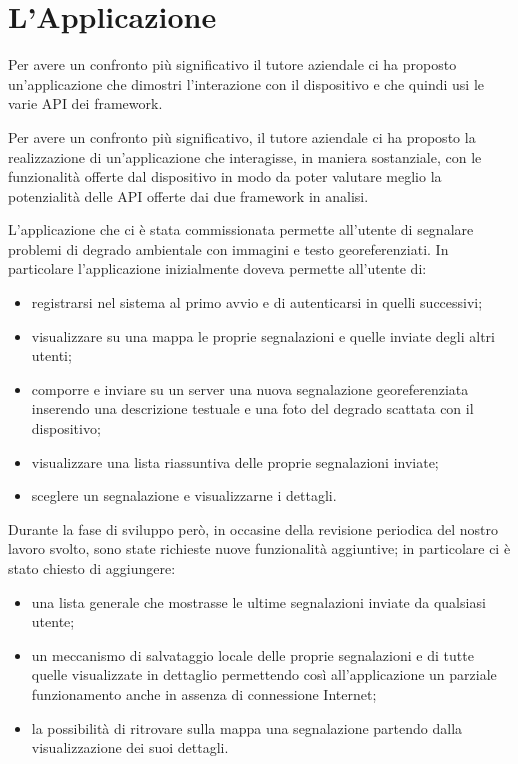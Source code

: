 \chapter{L'Applicazione}
	Per avere un confronto più significativo il tutore aziendale ci ha proposto 
	un'applicazione che dimostri l'interazione con il dispositivo e che quindi 
	usi le varie API dei framework.
	
	Per avere un confronto più significativo, il tutore aziendale ci ha proposto
	la realizzazione di un'applicazione che interagisse, in maniera sostanziale,
	con le funzionalità offerte dal dispositivo in modo da poter valutare meglio
	la potenzialità delle API offerte dai due framework in analisi.
	
	L'applicazione che ci è stata commissionata permette all'utente di segnalare 
	problemi di degrado ambientale con immagini e testo georeferenziati.
	In particolare l'applicazione inizialmente doveva permette all'utente di:
	\begin{itemize}
		\item registrarsi nel sistema al primo avvio e di autenticarsi in quelli
		      successivi;
		\item visualizzare su una mappa le proprie segnalazioni e quelle inviate
		      degli altri utenti;
		\item comporre e inviare su un server una nuova segnalazione
		      georeferenziata inserendo una descrizione testuale e una foto del
		      degrado scattata con il dispositivo;
		\item visualizzare una lista riassuntiva delle proprie segnalazioni
		      inviate;
		\item sceglere un segnalazione e visualizzarne i dettagli.
	\end{itemize}
	Durante la fase di sviluppo però, in occasine della revisione periodica del
	nostro lavoro svolto, sono state richieste nuove funzionalità aggiuntive; in
	particolare ci è stato chiesto di aggiungere:
	\begin{itemize}
		\item una lista generale che mostrasse le ultime segnalazioni inviate da
		      qualsiasi utente;
		\item un meccanismo di salvataggio locale delle proprie segnalazioni e
		      di tutte quelle visualizzate in dettaglio permettendo così
		      all'applicazione un parziale funzionamento anche in assenza di
		      connessione Internet;
		\item la possibilità di ritrovare sulla mappa una segnalazione partendo
		      dalla visualizzazione dei suoi dettagli.
	\end{itemize}
	
